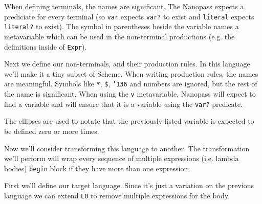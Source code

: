 \documentclass{book}
\newcommand{\Scribtexttt}[1]{{\texttt{#1}}}
\begin{document}
When defining terminals, the names are significant. The Nanopass expects
a prediciate for every terminal (so \Scribtexttt{var} expects \Scribtexttt{var{\hbox{\texttt{?}}}} to exist
and \Scribtexttt{literal} expects \Scribtexttt{literal{\hbox{\texttt{?}}}} to exist). The symbol in
parentheses beside the variable names a metavariable which can be used in
the non{-}terminal productions (e.g. the definitions inside of \Scribtexttt{Expr}).

Next we define our non{-}terminals, and their production rules. In this
language we{'}ll make it a tiny subset of Scheme. When writing production
rules, the names are meaningful. Symbols like \Scribtexttt{*}, \Scribtexttt{\$}, \Scribtexttt{{\char'136}} and
numbers are ignored, but the rest of the name is significant. When using
the \Scribtexttt{v} metavariable, Nanopass will expect to find a variable and will
ensure that it is a variable using the \Scribtexttt{var{\hbox{\texttt{?}}}} predicate.

The ellipses are used to notate that the previously listed variable is
expected to be defined zero or more times.

Now we{'}ll consider transforming this language to another. The
transformation we{'}ll perform will wrap every sequence of multiple
expressions (i.e. lambda bodies) \Scribtexttt{begin} block if they have more than
one expression.

First we{'}ll define our target language. Since it{'}s just a variation
on the previous language we can extend \Scribtexttt{L0} to remove multiple
expressions for the body.
\end{document}
